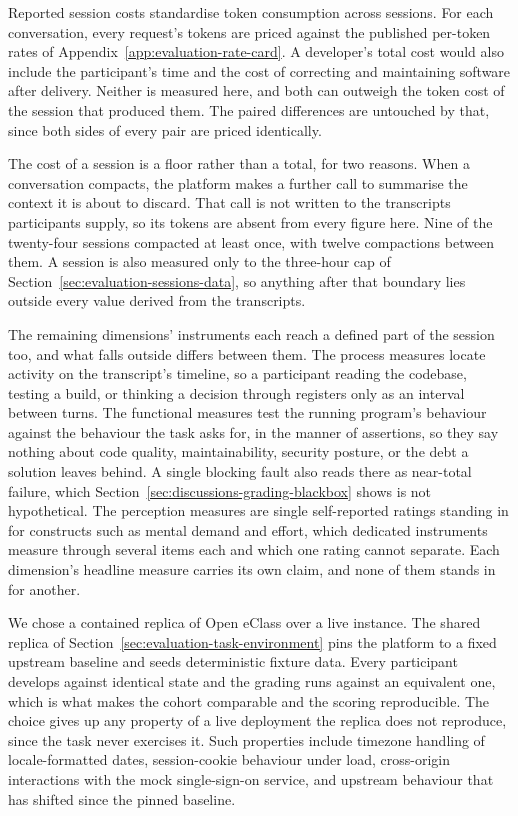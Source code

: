 Reported session costs standardise token consumption across sessions. For each conversation, every request's tokens are priced against the published per-token rates of Appendix~\ref{app:evaluation-rate-card}. A developer's total cost would also include the participant's time and the cost of correcting and maintaining software after delivery. Neither is measured here, and both can outweigh the token cost of the session that produced them. The paired differences are untouched by that, since both sides of every pair are priced identically.

The cost of a session is a floor rather than a total, for two reasons. When a conversation compacts, the platform makes a further call to summarise the context it is about to discard. That call is not written to the transcripts participants supply, so its tokens are absent from every figure here. Nine of the twenty-four sessions compacted at least once, with twelve compactions between them. A session is also measured only to the three-hour cap of Section~\ref{sec:evaluation-sessions-data}, so anything after that boundary lies outside every value derived from the transcripts.

The remaining dimensions' instruments each reach a defined part of the session too, and what falls outside differs between them. The process measures locate activity on the transcript's timeline, so a participant reading the codebase, testing a build, or thinking a decision through registers only as an interval between turns. The functional measures test the running program's behaviour against the behaviour the task asks for, in the manner of assertions, so they say nothing about code quality, maintainability, security posture, or the debt a solution leaves behind. A single blocking fault also reads there as near-total failure, which Section~\ref{sec:discussions-grading-blackbox} shows is not hypothetical. The perception measures are single self-reported ratings standing in for constructs such as mental demand and effort, which dedicated instruments measure through several items each and which one rating cannot separate. Each dimension's headline measure carries its own claim, and none of them stands in for another.

We chose a contained replica of Open eClass over a live instance. The shared replica of Section~\ref{sec:evaluation-task-environment} pins the platform to a fixed upstream baseline and seeds deterministic fixture data. Every participant develops against identical state and the grading runs against an equivalent one, which is what makes the cohort comparable and the scoring reproducible. The choice gives up any property of a live deployment the replica does not reproduce, since the task never exercises it. Such properties include timezone handling of locale-formatted dates, session-cookie behaviour under load, cross-origin interactions with the mock single-sign-on service, and upstream behaviour that has shifted since the pinned baseline.

